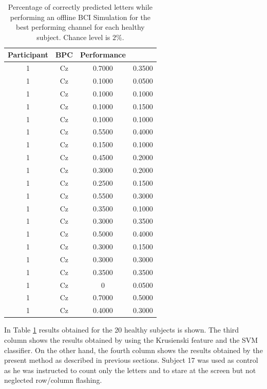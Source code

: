 \documentclass[entropy,article,submit,moreauthors,pdftex,10pt,a4paper]{mdpi}
\begin{document}
\begin{table}[H]
\caption{Percentage of correctly predicted letters while performing an offline BCI Simulation for the best performing channel for each healthy subject. Chance level is $2\%$. }
\centering
\begin{tabular}{cccc}
\toprule
\textbf{Participant}	&  \textbf{BPC}	& \textbf{Performance}\\
\midrule
1     &     Cz   &     0.7000  &  0.3500  \\
1     &     Cz   &    0.1000  &  0.0500 \\
1     &     Cz   &     0.1000  &  0.1000 \\
1     &     Cz   &     0.1000  &  0.1500 \\
1     &     Cz   &     0.1000  &  0.1000 \\
1     &     Cz   &     0.5500  &  0.4000 \\
1     &     Cz   &     0.1500   & 0.1000 \\
1     &     Cz   &     0.4500   & 0.2000 \\
1     &     Cz   &     0.3000  &  0.2000 \\
1     &     Cz   &     0.2500  &  0.1500 \\
1     &     Cz   &     0.5500  &  0.3000 \\
1     &     Cz   &     0.3500  &  0.1000 \\
1     &     Cz   &     0.3000  &  0.3500 \\
1     &     Cz   &     0.5000  &  0.4000 \\
1     &     Cz   &     0.3000  &  0.1500 \\
1     &     Cz   &     0.3000  &  0.3000 \\
1     &     Cz   &     0.3500  &  0.3500 \\
1     &     Cz   &          0      & 0.0500 \\
1     &     Cz   &     0.7000   & 0.5000 \\
1     &     Cz   &     0.4000  &  0.3000 \\

\bottomrule
\end{tabular}
\label{tab:resultsowndataset}
\end{table}

In Table \ref{tab:resultsowndataset} results obtained for the 20 healthy subjects is shown.  The third column shows the results obtained by using the Krusienski feature and the SVM classifier.  On the other hand, the fourth column shows the results obtained by the present method as described in previous sections.  Subject 17 was used as control as he was instructed to count only the letters and to stare at the screen but not neglected row/column flashing.
\end{document}
